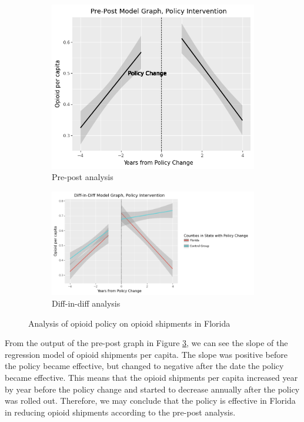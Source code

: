 \documentclass[12pt,letterpaper]{article}
\begin{document}
\begin{figure}[!h]
\centering
\begin{subfigure}{.5\textwidth}
  \centering
  \includegraphics[width=.7\linewidth]{../30_results/General_Results/florida_opioid_shipment_prepost.png}
  \caption{Pre-post analysis}
  \label{fig:fl_ship_prepost}
\end{subfigure}%
\begin{subfigure}{.55\textwidth}
  \centering
  \includegraphics[width=1\linewidth]{../30_results/General_Results/florida_opioid_shipment_diffdiff.png}
  \caption{Diff-in-diff analysis}
  \label{fig:fl_ship_did}
\end{subfigure}
\caption{Analysis of opioid policy on opioid shipments in Florida}
\label{fig:fl_ship}
\end{figure}

From the output of the pre-post graph in Figure \ref{fig:fl_ship}, we can see the slope of the regression model of opioid shipments per capita. The slope was positive before the policy became effective, but changed to negative after the date the policy became effective. This means that the opioid shipments per capita increased year by year before the policy change and started to decrease annually after the policy was rolled out. Therefore, we may conclude that the policy is effective in Florida in reducing opioid shipments according to the pre-post analysis.
\end{document}
